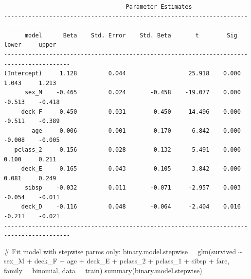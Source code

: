 \documentclass[
  letterpaper,
  DIV=11,
  numbers=noendperiod]{scrartcl}
\newenvironment{Shaded}{\begin{snugshade}}{\end{snugshade}}
\newcommand{\AttributeTok}[1]{\textcolor[rgb]{0.40,0.45,0.13}{#1}}
\newcommand{\CommentTok}[1]{\textcolor[rgb]{0.37,0.37,0.37}{#1}}
\newcommand{\FunctionTok}[1]{\textcolor[rgb]{0.28,0.35,0.67}{#1}}
\newcommand{\NormalTok}[1]{\textcolor[rgb]{0.00,0.23,0.31}{#1}}
\newcommand{\OtherTok}[1]{\textcolor[rgb]{0.00,0.23,0.31}{#1}}
\newcommand{\SpecialCharTok}[1]{\textcolor[rgb]{0.37,0.37,0.37}{#1}}
\begin{document}
\begin{verbatim}
                                   Parameter Estimates                                    
-----------------------------------------------------------------------------------------
      model      Beta    Std. Error    Std. Beta       t        Sig      lower     upper 
-----------------------------------------------------------------------------------------
(Intercept)     1.128         0.044                  25.918    0.000     1.043     1.213 
      sex_M    -0.465         0.024       -0.458    -19.077    0.000    -0.513    -0.418 
     deck_F    -0.450         0.031       -0.450    -14.496    0.000    -0.511    -0.389 
        age    -0.006         0.001       -0.170     -6.842    0.000    -0.008    -0.005 
   pclass_2     0.156         0.028        0.132      5.491    0.000     0.100     0.211 
     deck_E     0.165         0.043        0.105      3.842    0.000     0.081     0.249 
      sibsp    -0.032         0.011       -0.071     -2.957    0.003    -0.054    -0.011 
     deck_D    -0.116         0.048       -0.064     -2.404    0.016    -0.211    -0.021 
-----------------------------------------------------------------------------------------
\end{verbatim}

\begin{Shaded}
\begin{Highlighting}[]
\CommentTok{\# Fit model with stepwise parms only:}
\NormalTok{binary.model.stepwise }\OtherTok{=} \FunctionTok{glm}\NormalTok{(survived }\SpecialCharTok{\textasciitilde{}}\NormalTok{ sex\_M }\SpecialCharTok{+}\NormalTok{ deck\_F  }\SpecialCharTok{+}\NormalTok{ age }\SpecialCharTok{+}\NormalTok{ deck\_E  }\SpecialCharTok{+} 
\NormalTok{                              pclass\_2 }\SpecialCharTok{+}\NormalTok{ pclass\_1 }\SpecialCharTok{+}\NormalTok{ sibsp }\SpecialCharTok{+}\NormalTok{ fare, }
                            \AttributeTok{family =}\NormalTok{ binomial, }\AttributeTok{data =}\NormalTok{ train)}
\FunctionTok{summary}\NormalTok{(binary.model.stepwise)}
\end{Highlighting}
\end{Shaded}
\end{document}
